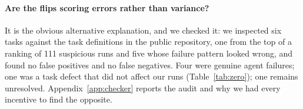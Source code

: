 \paragraph{Are the flips scoring errors rather than variance?} It is the
obvious alternative explanation, and we checked it: we inspected six tasks against the task definitions in the public repository,
one from the top of a ranking of 111 suspicious runs and five whose failure
pattern looked wrong, and found no false positives and no false negatives.
Four were genuine agent failures; one was a task defect that did not affect our
runs (Table~\ref{tab:zero}); one remains unresolved. Appendix~\ref{app:checker}
reports the audit and why we had every incentive to find the opposite.
